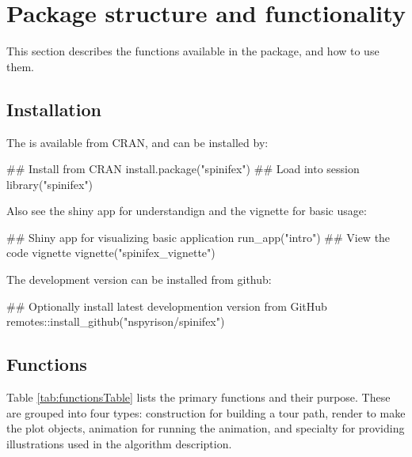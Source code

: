 \hypertarget{package-structure-and-functionality}{%
\section{Package structure and
functionality}\label{package-structure-and-functionality}}

This section describes the functions available in the package, and how
to use them.

\hypertarget{installation}{%
\subsection{Installation}\label{installation}}

The  is available from CRAN, and can be installed by:

\begin{Schunk}
\begin{Sinput}
## Install from CRAN
install.package("spinifex")
## Load into session
library("spinifex")
\end{Sinput}
\end{Schunk}

\noindent Also see the shiny app for understandign and the vignette for
basic usage:

\begin{Schunk}
\begin{Sinput}
## Shiny app for visualizing basic application
run_app("intro")
## View the code vignette
vignette("spinifex_vignette")
\end{Sinput}
\end{Schunk}

\noindent The development version can be installed from github:

\begin{Schunk}
\begin{Sinput}
## Optionally install latest developmention version from GitHub
remotes::install_github("nspyrison/spinifex")
\end{Sinput}
\end{Schunk}

\hypertarget{functions}{%
\subsection{Functions}\label{functions}}

Table \ref{tab:functionsTable} lists the primary functions and their
purpose. These are grouped into four types: construction for building a
tour path, render to make the plot objects, animation for running the
animation, and specialty for providing illustrations used in the
algorithm description.


